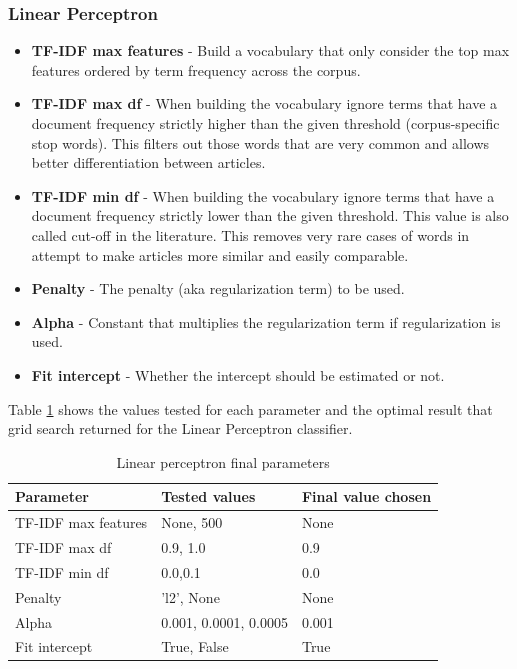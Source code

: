 \documentclass[a4paper,11pt]{report}
\begin{document}
\subsubsection{Linear Perceptron}
\begin{itemize}
	\item \textbf{TF-IDF max features} - Build a vocabulary that only consider the top max features ordered by term frequency across the corpus.
	\item \textbf{TF-IDF max df} - When building the vocabulary ignore terms that have a document frequency strictly higher than the given threshold (corpus-specific stop words). This filters out those words that are very common and allows better differentiation between articles.
	\item \textbf{TF-IDF min df} - When building the vocabulary ignore terms that have a document frequency strictly lower than the given threshold. This value is also called cut-off in the literature. This removes very rare cases of words in attempt to make articles more similar and easily comparable.
	\item \textbf{Penalty} - The penalty (aka regularization term) to be used.
	\item \textbf{Alpha} - Constant that multiplies the regularization term if regularization is used.
	\item \textbf{Fit intercept} - Whether the intercept should be estimated or not.
\end{itemize}

Table \ref{perceptron-finalp} shows the values tested for each parameter and the optimal result that grid search returned for the Linear Perceptron classifier.

\begin{table}[h!]
\centering
\caption{Linear perceptron final parameters}
\label{perceptron-finalp}
\begin{tabular}{|l|l|l|}
\hline
Parameter           & Tested values         & Final value chosen \\ \hline
TF-IDF max features & None, 500             & None               \\ \hline
TF-IDF max df       & 0.9, 1.0              & 0.9                \\ \hline
TF-IDF min df       & 0.0,0.1               & 0.0                \\ \hline
Penalty             & 'l2', None            & None               \\ \hline
Alpha               & 0.001, 0.0001, 0.0005 & 0.001              \\ \hline
Fit intercept       & True, False           & True               \\ \hline
\end{tabular}
\end{table}
\end{document}
